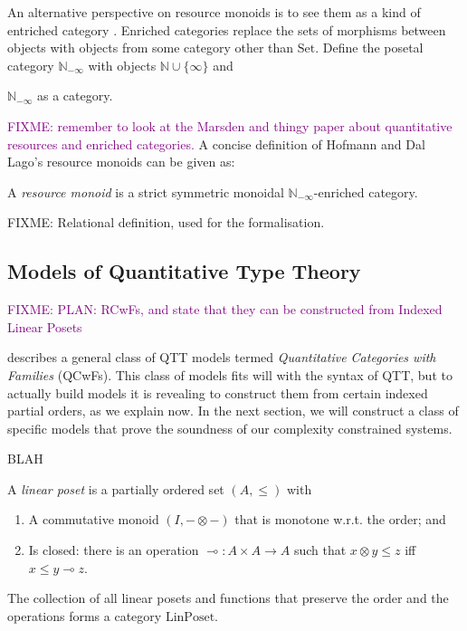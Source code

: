 \documentclass[acmsmall,review]{acmart}
\newcommand{\natinf}{\mathbb{N}_{-\infty}}
\newcommand{\Set}{\mathrm{Set}}
\newcommand{\LinPoset}{\mathrm{LinPoset}}
\newcommand{\bob}[1]{\textcolor{purple}{FIXME: #1}}
\begin{document}
An alternative perspective on resource monoids is to see them as a
kind of entriched category \cite{kelly}. Enriched categories replace
the sets of morphisms between objects with objects from some category
other than $\Set$. Define the posetal category $\natinf$ with objects $\mathbb{N} \cup \{\infty\}$ and

$\natinf$ as a category.

\bob{remember to look at the Marsden and thingy paper about
  quantitative resources and enriched categories.}  A concise
definition of Hofmann and Dal Lago's resource monoids can be given as:
\begin{definition}
  A \emph{resource monoid} is a strict symmetric monoidal
  $\natinf$-enriched category.
\end{definition}

FIXME: Relational definition, used for the formalisation.

\subsection{Models of Quantitative Type Theory}
\label{sec:qtt-models}

\bob{PLAN: RCwFs, and state that they can be constructed from Indexed Linear Posets}

\cite{atkey18} describes a general class of QTT models termed
\emph{Quantitative Categories with Families} (QCwFs). This class of
models fits will with the syntax of QTT, but to actually build models
it is revealing to construct them from certain indexed partial orders,
as we explain now. In the next section, we will construct a class of
specific models that prove the soundness of our complexity constrained
systems.

\begin{definition}
  BLAH
\end{definition}

\begin{definition}
  A \emph{linear poset} is a partially ordered set $(A, \leq)$ with
  \begin{enumerate}
  \item A commutative monoid $(I, -\otimes-)$ that is monotone
    w.r.t. the order; and
  \item Is closed: there is an operation
    $\multimap : A \times A \to A$ such that $x \otimes y \leq z$ iff
    $x \leq y \multimap z$.
  \end{enumerate}
  The collection of all linear posets and functions that preserve the
  order and the operations forms a category $\LinPoset$.
\end{definition}
\end{document}
